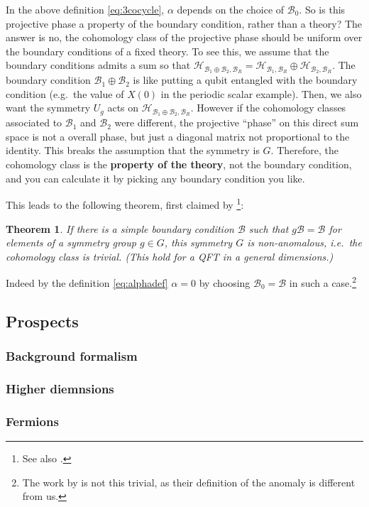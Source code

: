 \documentclass[
]{scrartcl}
\numberwithin{equation}{section}
\newtheorem{theorem}{Theorem}[section]
\theoremstyle{definition}
\theoremstyle{definition}
\theoremstyle{definition}
\theoremstyle{definition}
\theoremstyle{remark}
\begin{document}
In the above definition \eqref{eq:3cocycle}, \(\alpha\) depends on the choice of \(\mathcal{B}_0\). So is this projective phase a property of the boundary condition, rather than a theory?
The answer is no, the cohomology class of the projective phase should be uniform over the boundary conditions of a fixed theory.
To see this, we assume that the boundary conditions admits a sum so that \(\mathcal{H}_{\mathcal{B}_1\oplus \mathcal{B}_2,\mathcal{B}_R} = \mathcal{H}_{\mathcal{B}_1,\mathcal{B}_R} \oplus \mathcal{H}_{\mathcal{B}_2,\mathcal{B}_R}\).
The boundary condition \(\mathcal{B}_1\oplus \mathcal{B}_2\) is like
putting a qubit entangled with the boundary condition (e.g.~the value of \(X(0)\) in the periodic scalar example).
Then, we also want the symmetry \(U_g\) acts on \(\mathcal{H}_{\mathcal{B}_1\oplus \mathcal{B}_2,\mathcal{B}_R}\).
However if the cohomology classes associated to \(\mathcal{B}_1\) and \(\mathcal{B}_2\) were different, the projective ``phase'' on this direct sum space is not a overall phase, but just a diagonal matrix not proportional to the identity. This breaks the assumption that the symmetry is \(G\).
Therefore, the cohomology class is the \textbf{property of the theory}, not the boundary condition, and you can calculate it by picking any boundary condition you like.

This leads to the following theorem, first claimed by \textcite{Thorngren:2020yht} \footnote{See also \textcite{Hellerman:2021fla}.}:

\begin{theorem}
If there is a simple boundary condition \(\mathcal{B}\) such that \(g \mathcal{B} =\mathcal{B}\) for elements of a symmetry group \(g\in G\), this symmetry \(G\) is non-anomalous, i.e.~the cohomology class is trivial.
(This hold for a QFT in a general dimensions.)
\end{theorem}

Indeed by the definition \eqref{eq:alphadef} \(\alpha = 0\) by choosing \(\mathcal{B}_0 = \mathcal{B}\) in such a case.\footnote{The work by \textcite{Thorngren:2020yht} is not this trivial, as their definition of the anomaly is different from us.}

\hypertarget{prospects}{%
\subsection{Prospects}\label{prospects}}

\hypertarget{background-formalism}{%
\subsubsection{Background formalism}\label{background-formalism}}

\hypertarget{higher-diemnsions}{%
\subsubsection{Higher diemnsions}\label{higher-diemnsions}}

\hypertarget{fermions}{%
\subsubsection{Fermions}\label{fermions}}

\printbibliography
\end{document}
